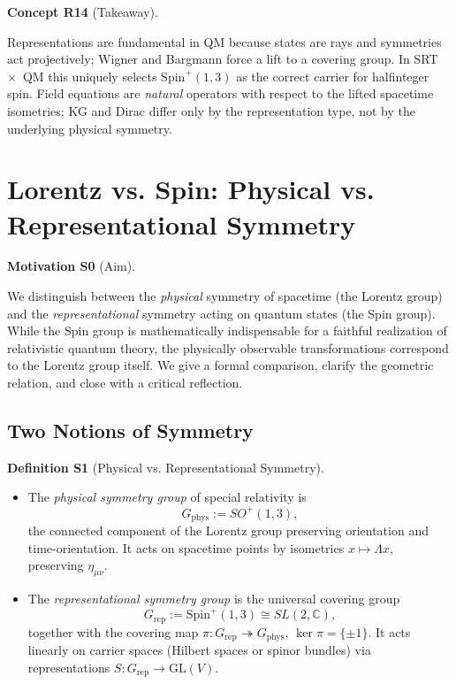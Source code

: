 \documentclass[10pt, letterpaper]{article}
\newcommand{\C}{\mathbb{C}}
\newcommand{\GL}{\mathrm{GL}}
\newcommand{\Spin}{\mathrm{Spin}}
\newcommand{\CustomHeading}[3]{%
  \par\medskip\noindent%
  \textbf{#1 #2} \textnormal{(#3)}.\enskip%
}
\newenvironment{DEF}[2]{\begin{unitbox}\CustomHeading{Definition}{#1}{#2}}{\end{unitbox}}
\newenvironment{CONC}[2]{\begin{unitbox}\CustomHeading{Concept}{#1}{#2}}{\end{unitbox}}
\newenvironment{MOT}[2]{\begin{unitbox}\CustomHeading{Motivation}{#1}{#2}}{\end{unitbox}}
\begin{document}
\begin{CONC}{R14}{Takeaway}
Representations are fundamental in QM because states are rays and symmetries act projectively; Wigner and Bargmann force a lift to a covering group. In SRT~$\times$~QM this uniquely selects $\Spin^+(1,3)$ as the correct carrier for halfinteger spin. Field equations are \emph{natural} operators with respect to the lifted spacetime isometries; KG and Dirac differ only by the representation type, not by the underlying physical symmetry.
\end{CONC}



\pagebreak


\section{Lorentz vs. Spin: Physical vs. Representational Symmetry}

\begin{MOT}{S0}{Aim}
We distinguish between the \emph{physical} symmetry of spacetime (the Lorentz group) and the \emph{representational} symmetry acting on quantum states (the Spin group).  
While the Spin group is mathematically indispensable for a faithful realization of relativistic quantum theory, the physically observable transformations correspond to the Lorentz group itself.  
We give a formal comparison, clarify the geometric relation, and close with a critical reflection.
\end{MOT}

\subsection{Two Notions of Symmetry}

\begin{DEF}{S1}{Physical vs. Representational Symmetry}
\begin{itemize}
\item The \emph{physical symmetry group} of special relativity is
\[
G_{\mathrm{phys}} := SO^+(1,3),
\]
the connected component of the Lorentz group preserving orientation and time-orientation.  
It acts on spacetime points by isometries $x\mapsto \Lambda x$, preserving $\eta_{\mu\nu}$.
\item The \emph{representational symmetry group} is the universal covering group
\[
G_{\mathrm{rep}} := \Spin^+(1,3)\cong SL(2,\C),
\]
together with the covering map $\pi:G_{\mathrm{rep}}\twoheadrightarrow G_{\mathrm{phys}}$, $\ker \pi=\{\pm 1\}$.
It acts linearly on carrier spaces (Hilbert spaces or spinor bundles) via representations $S:G_{\mathrm{rep}}\to \GL(V)$.
\end{itemize}
\end{DEF}
\end{document}
